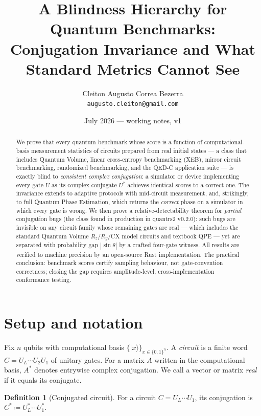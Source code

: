 \documentclass[11pt]{article}
\title{A Blindness Hierarchy for Quantum Benchmarks:\\
Conjugation Invariance and What Standard Metrics Cannot See}
\author{Cleiton Augusto Correa Bezerra\\
\small \texttt{augusto.cleiton@gmail.com}}
\date{July 2026 --- working notes, v1}
\theoremstyle{definition}
\newtheorem{definition}{Definition}
\theoremstyle{remark}
\newcommand{\ket}[1]{\lvert #1 \rangle}
\begin{document}
\maketitle

\begin{abstract}
We prove that every quantum benchmark whose score is a function of
computational-basis measurement statistics of circuits prepared from real
initial states --- a class that includes Quantum Volume, linear
cross-entropy benchmarking (XEB), mirror circuit benchmarking, randomized
benchmarking, and the QED-C application suite --- is exactly blind to
\emph{consistent complex conjugation}: a simulator or device implementing
every gate $U$ as its complex conjugate $U^{*}$ achieves identical scores
to a correct one. The invariance extends to adaptive protocols with
mid-circuit measurement, and, strikingly, to full Quantum Phase
Estimation, which returns the \emph{correct} phase on a simulator in
which every gate is wrong. We then prove a relative-detectability
theorem for \emph{partial} conjugation bugs (the class found in
production in quantrs2 v0.2.0): such bugs are invisible on any circuit
family whose remaining gates are real --- which includes the standard
Quantum Volume $R_z$/$R_y$/CX model circuits and textbook QPE --- yet
are separated with probability gap $|\sin\theta|$ by a crafted four-gate
witness. All results are verified to machine precision by an open-source
Rust implementation. The practical conclusion: benchmark scores certify
sampling behaviour, not gate-convention correctness; closing the gap
requires amplitude-level, cross-implementation conformance testing.
\end{abstract}

\section{Setup and notation}

Fix $n$ qubits with computational basis
$\{\ket{x}\}_{x\in\{0,1\}^{n}}$. A \emph{circuit} is a finite word
$C = U_{L}\cdots U_{2}U_{1}$ of unitary gates. For a matrix $A$ written
in the computational basis, $A^{*}$ denotes entrywise complex
conjugation. We call a vector or matrix \emph{real} if it equals its
conjugate.

\begin{definition}[Conjugated circuit]
For a circuit $C = U_{L}\cdots U_{1}$, its conjugation is
$C^{*} \coloneqq U_{L}^{*}\cdots U_{1}^{*}$.
\end{definition}
\end{document}
